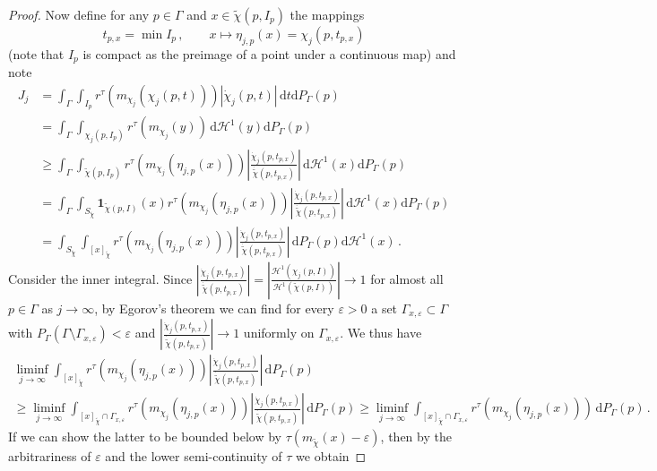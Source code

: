 \documentclass[10pt,a4paper,oneside,final]{article}
\newcommand{\de}{{\mathrm{d}}}
\newcommand{\setchar}[1]{\mathbf{1}_{#1}}
\newcommand{\hdone}{\mathcal{H}^1}
\newcommand{\reSpace}{\Gamma}
\newcommand{\reMeasure}{P_{\reSpace}}
\numberwithin{equation}{section}
\theoremstyle{plain}
\theoremstyle{definition}
\theoremstyle{remark}
\begin{document}
{\begin{proof}
Now define for any $p\in\reSpace$ and $x\in\tilde\chi(p,I_p)$ the mappings
\begin{equation*}
t_{p,x}=\min I_p\,,\qquad
x\mapsto\eta_{j,p}(x)=\chi_j(p,t_{p,x})
\end{equation*}
(note that $I_p$ is compact as the preimage of a point under a continuous map) and note
\begin{align*}
J_j
&=\int_\reSpace\int_{I_p}r^\tau(m_{\chi_j}(\chi_j(p,t)))|\dot\chi_j(p,t)|\,\de t\de\reMeasure(p)\\
&=\int_\reSpace\int_{\chi_j(p,I_p)}r^\tau(m_{\chi_j}(y))\,\de\hdone(y)\de\reMeasure(p)\\
&\geq\int_\reSpace\int_{\tilde\chi(p,I_p)}r^\tau(m_{\chi_j}(\eta_{j,p}(x)))|\tfrac{\dot\chi_j(p,t_{p,x})}{\dot{\tilde\chi}(p,t_{p,x})}|\,\de\hdone(x)\de\reMeasure(p)\\
&=\int_\reSpace\int_{S_{\tilde\chi}}\setchar{\tilde\chi(p,I)}(x)r^\tau(m_{\chi_j}(\eta_{j,p}(x)))|\tfrac{\dot\chi_j(p,t_{p,x})}{\dot{\tilde\chi}(p,t_{p,x})}|\,\de\hdone(x)\de\reMeasure(p)\\
&=\int_{S_{\tilde\chi}}\int_{[x]_{\tilde\chi}}r^\tau(m_{\chi_j}(\eta_{j,p}(x)))|\tfrac{\dot\chi_j(p,t_{p,x})}{\dot{\tilde\chi}(p,t_{p,x})}|\,\de\reMeasure(p)\de\hdone(x)\,.
\end{align*}
Consider the inner integral.
Since $|\tfrac{\dot\chi_j(p,t_{p,x})}{\dot{\tilde\chi}(p,t_{p,x})}|=|\tfrac{\hdone(\chi_j(p,I))}{\hdone(\tilde\chi(p,I))}|\to1$ for almost all $p\in\reSpace$ as $j\to\infty$,
by Egorov's theorem we can find for every $\varepsilon>0$ a set $\reSpace_{x,\varepsilon}\subset\reSpace$ with $\reMeasure(\reSpace\setminus\reSpace_{x,\varepsilon})<\varepsilon$
and $|\tfrac{\dot\chi_j(p,t_{p,x})}{\dot{\tilde\chi}(p,t_{p,x})}|\to1$ uniformly on $\reSpace_{x,\varepsilon}$.
We thus have
\begin{multline*}
\liminf_{j\to\infty}\int_{[x]_{\tilde\chi}}r^\tau(m_{\chi_j}(\eta_{j,p}(x)))|\tfrac{\dot\chi_j(p,t_{p,x})}{\dot{\tilde\chi}(p,t_{p,x})}|\,\de\reMeasure(p)\\
\geq\liminf_{j\to\infty}\int_{[x]_{\tilde\chi}\cap\reSpace_{x,\varepsilon}}r^\tau(m_{\chi_j}(\eta_{j,p}(x)))|\tfrac{\dot\chi_j(p,t_{p,x})}{\dot{\tilde\chi}(p,t_{p,x})}|\,\de\reMeasure(p)
\geq\liminf_{j\to\infty}\int_{[x]_{\tilde\chi}\cap\reSpace_{x,\varepsilon}}r^\tau(m_{\chi_j}(\eta_{j,p}(x)))\,\de\reMeasure(p)\,.
\end{multline*}
If we can show the latter to be bounded below by $\tau(m_{\tilde\chi}(x)-\varepsilon)$, then by the arbitrariness of $\varepsilon$ and the lower semi-continuity of $\tau$ we obtain

\end{proof}}
\end{document}
